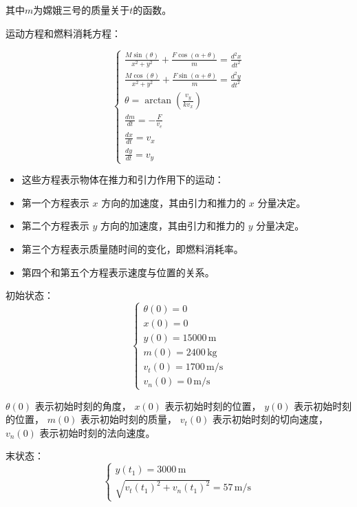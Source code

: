 \documentclass{ctexart}
\begin{document}
其中\(m\)为嫦娥三号的质量关于\(t\)的函数。

运动方程和燃料消耗方程：

\begin{equation}
\begin{cases}
\displaystyle \frac{M \sin(\theta)}{x^2 + y^2} + \frac{F \cos(\alpha + \theta)}{m} = \frac{d^2 x}{dt^2} \\
\displaystyle \frac{M \cos(\theta)}{x^2 + y^2} + \frac{F \sin(\alpha + \theta)}{m} = \frac{d^2 y}{dt^2} \\
\displaystyle \theta = \arctan\left( \frac{v_y}{k v_x} \right) \\
\displaystyle \frac{dm}{dt} = -\frac{F}{v_e} \\
\displaystyle \frac{dx}{dt} = v_x \\
\displaystyle \frac{dy}{dt} = v_y
\end{cases}
\end{equation}

\begin{itemize}
\item 这些方程表示物体在推力和引力作用下的运动：
\item 第一个方程表示 $x$ 方向的加速度，其由引力和推力的 $x$ 分量决定。
\item 第二个方程表示 $y$ 方向的加速度，其由引力和推力的 $y$ 分量决定。
\item 第三个方程表示质量随时间的变化，即燃料消耗率。
\item 第四个和第五个方程表示速度与位置的关系。
\end{itemize}

初始状态：
\begin{equation}
\begin{cases}
\theta(0) = 0 \\
x(0) = 0 \\
y(0) = 15000 \, \text{m} \\
m(0) = 2400 \, \text{kg} \\
v_t(0) = 1700 \, \text{m/s} \\
v_n(0) = 0 \, \text{m/s}
\end{cases}
\end{equation}


$\theta(0)$ 表示初始时刻的角度，
$x(0)$ 表示初始时刻的位置，
$y(0)$ 表示初始时刻的位置，
$m(0)$ 表示初始时刻的质量，
$v_t(0)$ 表示初始时刻的切向速度，
$v_n(0)$ 表示初始时刻的法向速度。

末状态：
\begin{equation}
\begin{cases}
y(t_1) = 3000 \, \text{m} \\
\sqrt{v_t(t_1)^2 + v_n(t_1)^2} = 57 \, \text{m/s}
\end{cases}
\end{equation}
\end{document}
